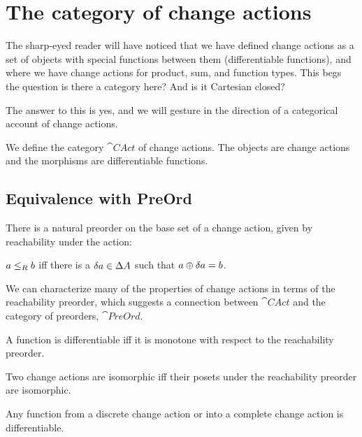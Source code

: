 \section{The category of change actions}
\label{sec:category}

The sharp-eyed reader will have noticed that we have defined change actions as a
set of objects with special functions between them (differentiable functions),
and where we have change actions for product, sum, and function types. This begs
the question \textemdash{} is there a category here? And is it Cartesian closed?

The answer to this is yes, and we will gesture in the direction of a categorical
account of change actions.

\begin{defn}
  We define the category $\cat{CAct}$ of change actions. The objects are
  change actions and the morphisms are differentiable functions. 
\end{defn}

\subsection{Equivalence with PreOrd}

There is a natural preorder on the base set of a change action, given by reachability
under the action:

\begin{defn}
  $a \leq_R b$ iff there is a $\delta a \in \Delta A$ such that $a \oplus
  \delta a = b$.
\end{defn}

We can characterize many of the properties of change actions in terms of the reachability preorder,
which suggests a connection between $\cat{CAct}$ and the category of preorders, $\cat{PreOrd}$.

\begin{prop}
  A function is differentiable iff it is monotone with respect to the
  reachability preorder. 
\end{prop}

\begin{corollary}
  Two change actions are isomorphic iff their posets under the reachability
  preorder are isomorphic.
\end{corollary}

\begin{corollary}
  Any function from a discrete change action or into a complete change
  action is differentiable.
\end{corollary}


